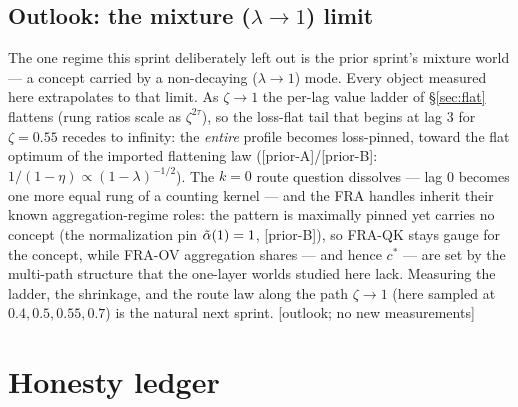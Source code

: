 \documentclass{article}
\newcommand{\htag}[1]{{\normalfont\sffamily\footnotesize[#1]}}
\newcommand{\priorA}{\textsf{[prior-A]}}
\newcommand{\priorB}{\textsf{[prior-B]}}
\begin{document}
\subsection{Outlook: the mixture ($\lambda\to1$) limit}\label{sec:mixture}
The one regime this sprint deliberately left out is the prior sprint's mixture world ---
a concept carried by a non-decaying ($\lambda\to1$) mode. Every object measured here
extrapolates to that limit. As $\zeta\to1$ the per-lag value ladder of \S\ref{sec:flat}
flattens (rung ratios scale as $\zeta^{2\tau}$), so the loss-flat tail that begins at
lag 3 for $\zeta=0.55$ recedes to infinity: the \emph{entire} profile becomes
loss-pinned, toward the flat optimum of the imported flattening law
(\priorA/\priorB: $1/(1-\eta)\propto(1-\lambda)^{-1/2}$). The $k{=}0$ route question
dissolves --- lag 0 becomes one more equal rung of a counting kernel --- and the FRA
handles inherit their known aggregation-regime roles: the pattern is maximally pinned
yet carries no concept (the normalization pin $\Tilde{\alpha}(1)=1$, \priorB), so FRA-QK
stays gauge for the concept, while FRA-OV aggregation shares --- and hence $c^\ast$ ---
are set by the multi-path structure that the one-layer worlds studied here lack.
Measuring the ladder, the shrinkage, and the route law along the path $\zeta\to1$ (here
sampled at $0.4,0.5,0.55,0.7$) is the natural next sprint.
\htag{outlook; no new measurements}

\section{Honesty ledger}\label{sec:honesty}
\end{document}
